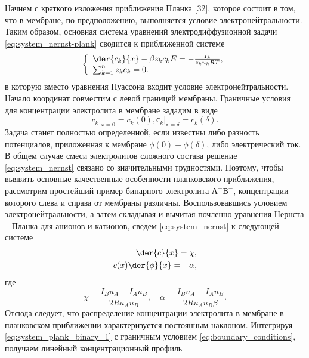 Начнем с краткого изложения приближения Планка [32], которое состоит в том, что
в мембране, по предположению, выполняется условие электронейтральности. Таким
образом, основная система уравнений электродиффузионной задачи
\eqref{eq:system_nernst-plank} сводится к приближенной системе
\begin{equation}
\left\{
    \begin{array}{l}
        \der{c_k}{x} - \beta z_k c_k E = - \frac{I_k}{z_k u_k RT},\\
        \sum_{k=1}^n z_k c_k = 0.
    \end{array}
\right.
\label{eq:system_nernst}
\end{equation}
в которую вместо уравнения Пуассона входит условие электронейтральности. Начало
координат совместим с левой границей мембраны. Граничные условия для
концентрации электролита в мембране зададим в виде
\begin{equation}
    \left.c_k\right|_{x=0} = c_k(0), \left.с_k\right|_{х=\delta} = c_k(\delta).
    \label{eq:boundary_conditions}
\end{equation}
Задача станет полностью определенной, если известны либо разность потенциалов,
приложенная к мембране \( \phi(0) - \phi(\delta) \), либо электрический ток.
В общем случае смеси электролитов сложного состава решение
\eqref{eq:system_nernst} связано со значительными трудностями. Поэтому, чтобы
выявить основные качественные особенности планковского приближения, рассмотрим
простейший пример бинарного электролита \( А^+В^- \), концентрации которого
слева и справа от мембраны различны. Воспользовавшись условием
электронейтральности, а затем складывая и вычитая почленно уравнения
Нернста -- Планка для анионов и катионов, сведем \eqref{eq:system_nernst} к
следующей системе
\begin{align}
    \der{c}{x} = \chi,              \label{eq:system_plank_binary_1}\\
    c(x)\der{\phi}{x} = -\alpha,    \label{eq:system_plank_binary_2}
\end{align}
где
\begin{equation}
    \chi = \frac{I_B u_A - I_A u_B}{2Ru_Au_B},\quad
    \alpha = \frac{I_B u_A + I_A u_B}{2Ru_Au_B\beta}.
    \label{eq:system_plank_binary_subs}
\end{equation}
Отсюда следует, что распределение концентрации электролита в мембране в
планковском приближении характеризуется постоянным наклоном. Интегрируя
\eqref{eq:system_plank_binary_1} с граничным условием
\eqref{eq:boundary_conditions}, получаем линейный концентрационный профиль
